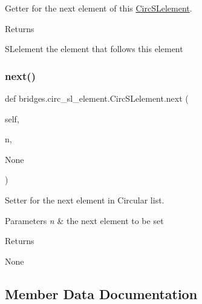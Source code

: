 Getter for the next element of this \hyperlink{classbridges_1_1circ__sl__element_1_1_circ_s_lelement}{Circ\+S\+Lelement}. 

\begin{DoxyReturn}{Returns}


S\+Lelement the element that follows this element 
\end{DoxyReturn}
\mbox{\label{classbridges_1_1circ__sl__element_1_1_circ_s_lelement_a0215303874e167e22f92e4adbdee1e84}} 
\subsubsection{\texorpdfstring{next()}{next()}\hspace{0.1cm}{\footnotesize\ttfamily [2/2]}}
{\footnotesize\ttfamily def bridges.\+circ\+\_\+sl\+\_\+element.\+Circ\+S\+Lelement.\+next (\begin{DoxyParamCaption}\item[{}]{self,  }\item[{}]{n,  }\item[{}]{None }\end{DoxyParamCaption})}



Setter for the next element in Circular list. 


\begin{DoxyParams}{Parameters}
{\em n} & the next element to be set \\
\hline
\end{DoxyParams}
\begin{DoxyReturn}{Returns}

\end{DoxyReturn}
\begin{DoxyParagraph}{None}

\end{DoxyParagraph}


\subsection{Member Data Documentation}
\mbox{\label{classbridges_1_1circ__sl__element_1_1_circ_s_lelement_afc8fa34bcbc539e7966db5ec471e3959}} 
